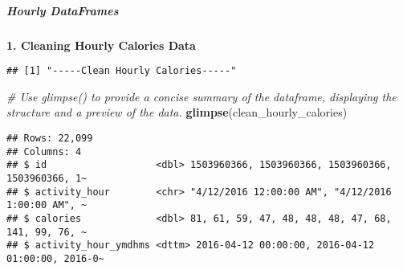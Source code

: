 \documentclass[
]{article}
\newenvironment{Shaded}{\begin{snugshade}}{\end{snugshade}}
\newcommand{\AttributeTok}[1]{\textcolor[rgb]{0.13,0.29,0.53}{#1}}
\newcommand{\CommentTok}[1]{\textcolor[rgb]{0.56,0.35,0.01}{\textit{#1}}}
\newcommand{\FunctionTok}[1]{\textcolor[rgb]{0.13,0.29,0.53}{\textbf{#1}}}
\newcommand{\NormalTok}[1]{#1}
\newcommand{\OtherTok}[1]{\textcolor[rgb]{0.56,0.35,0.01}{#1}}
\newcommand{\SpecialCharTok}[1]{\textcolor[rgb]{0.81,0.36,0.00}{\textbf{#1}}}
\newcommand{\StringTok}[1]{\textcolor[rgb]{0.31,0.60,0.02}{#1}}
\begin{document}
\hypertarget{hourly-dataframes-1}{%
\subparagraph{Hourly DataFrames}\label{hourly-dataframes-1}}

\textbf{1. Cleaning Hourly Calories Data}

\begin{Shaded}
\end{Shaded}

\begin{verbatim}
## [1] "-----Clean Hourly Calories-----"
\end{verbatim}

\begin{Shaded}
\begin{Highlighting}[]
\CommentTok{\# Use glimpse() to provide a concise summary of the dataframe, displaying the structure and a preview of the data.}
\FunctionTok{glimpse}\NormalTok{(clean\_hourly\_calories)}
\end{Highlighting}
\end{Shaded}

\begin{verbatim}
## Rows: 22,099
## Columns: 4
## $ id                   <dbl> 1503960366, 1503960366, 1503960366, 1503960366, 1~
## $ activity_hour        <chr> "4/12/2016 12:00:00 AM", "4/12/2016 1:00:00 AM", ~
## $ calories             <dbl> 81, 61, 59, 47, 48, 48, 48, 47, 68, 141, 99, 76, ~
## $ activity_hour_ymdhms <dttm> 2016-04-12 00:00:00, 2016-04-12 01:00:00, 2016-0~
\end{verbatim}
\end{document}
